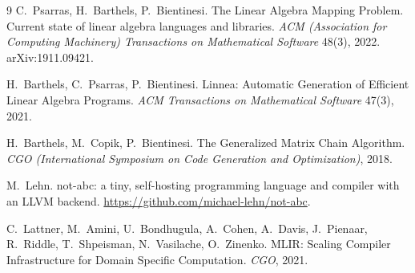 \documentclass[11pt,a4paper]{article}
\begin{document}
\begin{thebibliography}{9}
C.~Psarras, H.~Barthels, P.~Bientinesi.
\newblock The Linear Algebra Mapping Problem. Current state of linear
algebra languages and libraries.
\newblock \emph{ACM (Association for Computing Machinery) Transactions on
Mathematical Software} 48(3), 2022. arXiv:1911.09421.

H.~Barthels, C.~Psarras, P.~Bientinesi.
\newblock Linnea: Automatic Generation of Efficient Linear Algebra
Programs.
\newblock \emph{ACM Transactions on Mathematical Software} 47(3), 2021.

H.~Barthels, M.~Copik, P.~Bientinesi.
\newblock The Generalized Matrix Chain Algorithm.
\newblock \emph{CGO (International Symposium on Code Generation and
Optimization)}, 2018.

M.~Lehn.
\newblock not-abc: a tiny, self-hosting programming language and compiler
with an LLVM backend.
\newblock \url{https://github.com/michael-lehn/not-abc}.

C.~Lattner, M.~Amini, U.~Bondhugula, A.~Cohen, A.~Davis, J.~Pienaar,
R.~Riddle, T.~Shpeisman, N.~Vasilache, O.~Zinenko.
\newblock MLIR: Scaling Compiler Infrastructure for Domain Specific
Computation.
\newblock \emph{CGO}, 2021.
\end{thebibliography}
\end{document}
